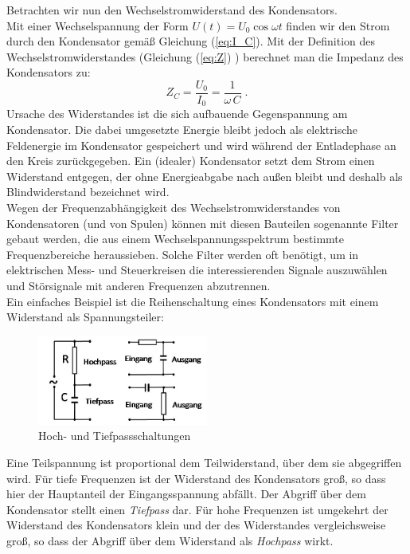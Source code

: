 Betrachten wir nun den Wechselstromwiderstand des Kondensators.\\
Mit einer Wechselspannung der Form $U(t) =  U_0\cos\omega t$ finden wir den Strom durch den Kondensator gemäß Gleichung (\ref{eq:I_C}). Mit der Definition des Wechselstromwiderstandes (Gleichung (\ref{eq:Z}) ) berechnet man die Impedanz des Kondensators zu:
\begin{equation}
 Z_C = \frac{U_0}{I_0} = \frac{1}{\omega\, C}\; .
\end{equation}
Ursache des Widerstandes ist die sich aufbauende Gegenspannung am Kondensator. Die dabei umgesetzte Energie bleibt jedoch als elektrische Feldenergie im Kondensator gespeichert und wird während der Entladephase an den Kreis zurückgegeben. Ein (idealer) Kondensator setzt dem Strom einen Widerstand entgegen, der ohne Energieabgabe nach außen bleibt und deshalb als Blindwiderstand bezeichnet wird.\\

Wegen der Frequenzabhängigkeit des Wechselstromwiderstandes von Kondensatoren (und von Spulen) können mit diesen Bauteilen sogenannte Filter gebaut werden, die aus einem Wechselspannungsspektrum bestimmte Frequenzbereiche heraussieben. Solche Filter werden oft benötigt, um in elektrischen Mess- und Steuerkreisen die interessierenden Signale auszuwählen und Störsignale mit anderen Frequenzen abzutrennen. \\
Ein einfaches Beispiel ist die Reihenschaltung eines Kondensators mit einem Widerstand als Spannungsteiler:
\begin{figure}[ht]
	\centering
		\includegraphics[width=0.5\textwidth]{Versuch_15-16/Abbildungen/Paesse_gross.jpg}
	\caption{Hoch- und Tiefpassschaltungen}
	\label{fig:Hoch-Tiefpass}
\end{figure}
Eine Teilspannung ist proportional dem Teilwiderstand, über dem sie abgegriffen wird. Für tiefe Frequenzen ist der Widerstand des Kondensators groß, so dass hier der Hauptanteil der Eingangsspannung abfällt. Der Abgriff über dem Kondensator stellt einen \textit{Tiefpass} dar. Für hohe Frequenzen ist umgekehrt der Widerstand des Kondensators klein und der des Widerstandes vergleichsweise groß, so dass der Abgriff über dem Widerstand als \textit{Hochpass} wirkt.
